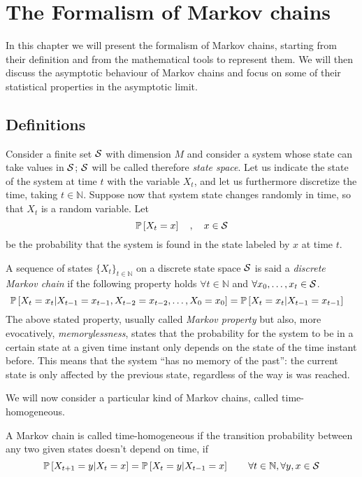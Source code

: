 \chapter{The Formalism of Markov chains}
In this chapter we will present the formalism of Markov chains, starting from their definition and from the mathematical tools to represent them. We will then discuss the asymptotic behaviour of Markov chains and focus on some of their statistical properties in the asymptotic limit.
\label{ch:markov_chains}
\section{Definitions}
Consider a finite set $\mathcal{S}$ with dimension $M$ and consider a system whose state can take values in $\mathcal{S}$; $\mathcal{S}$ will be called therefore \emph{state space}. Let us indicate the state of the system at time $t$ with the variable $X_t$, and let us furthermore discretize the time, taking $t \in \mathbb{N}$. Suppose now that system state changes randomly in time, so that $X_t$ is a random variable. Let
\begin{equation}
    \mathbb{P}\left[X_t = x\right] \quad , \quad x \in \mathcal{S}
\end{equation}
be the probability that the system is found in the state labeled by $x$ at time $t$.

\begin{ndef}  \label{def:markov-chain}
    A sequence of states $\{X_t\}_{t\in \mathbb{N}}$ on a discrete state space $\mathcal{S}$ is said a \emph{discrete Markov chain} if the following property holds $\forall t \in \mathbb N$ and $\forall x_0, \dots, x_t \in \mathcal{S}$.
    \begin{equation}
        \mathbb{P}\left[ X_t = x_t | X_{t-1} = x_{t-1}, X_{t-2} = x_{t-2}, \dots, X_0 = x_0 \right] = \mathbb{P}\left[ X_t = x_t | X_{t-1} = x_{t-1} \right] \quad
    \end{equation}
The above stated property, usually called \emph{Markov property} but also, more evocatively, \emph{memorylessness}, states that the probability for the system to be in a certain state at a given time instant only depends on the state of the time instant before. This means that the system \enquote{has no memory of the past}: the current state is only affected by the previous state, regardless of the way is was reached.
\end{ndef}

We will now consider a particular kind of Markov chains, called time-homogeneous.
\begin{ndef}  A Markov chain is called time-homogeneous if the transition probability between any two given states doesn't depend on time, \ie if
    \begin{equation}
        \mathbb{P}\left[X_{t+1} = y | X_{t} = x\right] = \mathbb{P}\left[X_{t} = y | X_{t-1} = x\right] \quad \quad \forall t\in \mathbb{N}, \forall y, x \in \mathcal{S}
    \end{equation}
\end{ndef}

